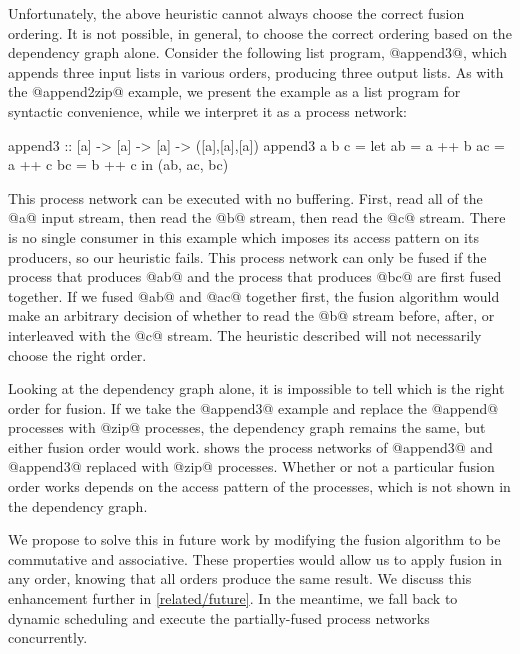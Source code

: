 Unfortunately, the above heuristic cannot always choose the correct fusion ordering.
It is not possible, in general, to choose the correct ordering based on the dependency graph alone.
Consider the following list program, @append3@, which appends three input lists in various orders, producing three output lists.
As with the @append2zip@ example, we present the example as a list program for syntactic convenience, while we interpret it as a process network:

\begin{haskell}
append3 :: [a] -> [a] -> [a] -> ([a],[a],[a])
append3 a b c =
  let ab = a ++ b
      ac = a ++ c
      bc = b ++ c
  in  (ab, ac, bc)
\end{haskell}




This process network can be executed with no buffering.
First, read all of the @a@ input stream, then read the @b@ stream, then read the @c@ stream.
There is no single consumer in this example which imposes its access pattern on its producers, so our heuristic fails.
This process network can only be fused if the process that produces @ab@ and the process that produces @bc@ are first fused together.
If we fused @ab@ and @ac@ together first, the fusion algorithm would make an arbitrary decision of whether to read the @b@ stream before, after, or interleaved with the @c@ stream.
The heuristic described will not necessarily choose the right order.

Looking at the dependency graph alone, it is impossible to tell which is the right order for fusion.
If we take the @append3@ example and replace the @append@ processes with @zip@ processes, the dependency graph remains the same, but either fusion order would work.
 shows the process networks of @append3@ and @append3@ replaced with @zip@ processes.
Whether or not a particular fusion order works depends on the access pattern of the processes, which is not shown in the dependency graph.



We propose to solve this in future work by modifying the fusion algorithm to be commutative and associative.
These properties would allow us to apply fusion in any order, knowing that all orders produce the same result.
We discuss this enhancement further in \cref{related/future}.
In the meantime, we fall back to dynamic scheduling and execute the partially-fused process networks concurrently.


